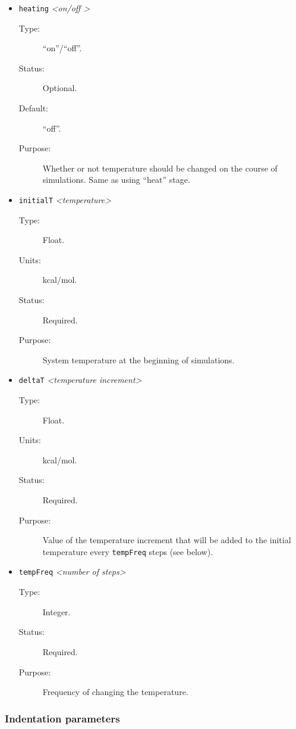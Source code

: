\documentclass[a4paper]{article}
\begin{document}
\begin{itemize}

\item \texttt{heating} \textit{\textless on/off \textgreater}
\begin{description}
\item[Type:] ``on''/``off''.
\item[Status:] Optional.
\item[Default:] ``off''.
\item[Purpose:] Whether or not temperature should be changed on the course of simulations. Same as using ``heat'' stage.
\end{description}

\item \texttt{initialT} \textit{\textless temperature\textgreater}
\begin{description}
\item[Type:] Float.
\item[Units:] kcal/mol.
\item[Status:] Required.
\item[Purpose:] System temperature at the beginning of simulations.
\end{description}

\item \texttt{deltaT} \textit{\textless temperature increment\textgreater}
\begin{description}
\item[Type:] Float.
\item[Units:] kcal/mol.
\item[Status:] Required.
\item[Purpose:] Value of the temperature increment that will be added to the initial temperature every \texttt{tempFreq} steps (see below).
\end{description}

\item \texttt{tempFreq} \textit{\textless number of steps\textgreater}
\begin{description}
\item[Type:] Integer.
\item[Status:] Required.
\item[Purpose:] Frequency of changing the temperature.
\end{description}

\end{itemize}

   
\subsubsection{Indentation parameters}
\label{sec:par.indentation}
\end{document}
